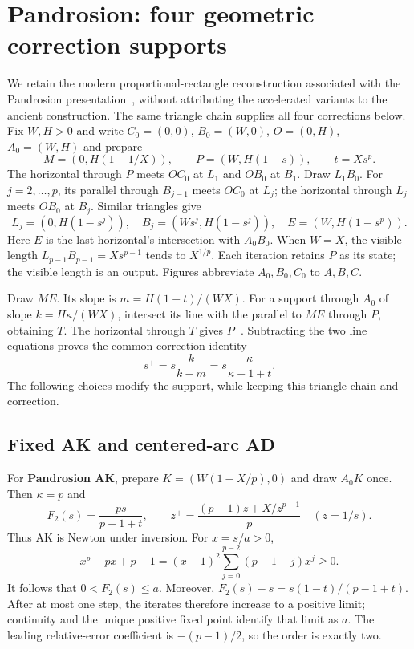 \documentclass[11pt,a4paper]{article}
\theoremstyle{remark}\newtheorem{remark}[theorem]{Remark}
\begin{document}
\section{Pandrosion: four geometric correction supports}\label{sec:pandrosion}
We retain the modern proportional-rectangle reconstruction associated with the Pandrosion presentation~\cite{launayPandrosion}, without attributing the accelerated variants to the ancient construction. The same triangle chain supplies all four corrections below. Fix $W,H>0$ and write $C_0=(0,0)$, $B_0=(W,0)$, $O=(0,H)$, $A_0=(W,H)$ and prepare
\[
 M=(0,H(1-1/X)),\qquad P=(W,H(1-s)),\qquad t=Xs^p.
\]
The horizontal through $P$ meets $OC_0$ at $L_1$ and $OB_0$ at $B_1$. Draw $L_1B_0$. For $j=2,\ldots,p$, its parallel through $B_{j-1}$ meets $OC_0$ at $L_j$; the horizontal through $L_j$ meets $OB_0$ at $B_j$. Similar triangles give
\begin{equation}\label{eq:pandchain}
 L_j=(0,H(1-s^j)),\quad B_j=(Ws^j,H(1-s^j)),\quad E=(W,H(1-s^p)).
\end{equation}
Here $E$ is the last horizontal's intersection with $A_0B_0$. When $W=X$, the visible length $L_{p-1}B_{p-1}=Xs^{p-1}$ tends to $X^{1/p}$. Each iteration retains $P$ as its state; the visible length is an output. Figures abbreviate $A_0,B_0,C_0$ to $A,B,C$.

Draw $ME$. Its slope is $m=H(1-t)/(WX)$. For a support through $A_0$ of slope $k=H\kappa/(WX)$, intersect its line with the parallel to $ME$ through $P$, obtaining $T$. The horizontal through $T$ gives $P^+$. Subtracting the two line equations proves the common correction identity
\begin{equation}\label{eq:commonreport}
 s^+=s\frac{k}{k-m}=s\frac{\kappa}{\kappa-1+t}.
\end{equation}
The following choices modify the support, while keeping this triangle chain and correction.

\subsection{Fixed AK and centered-arc AD}
For \textbf{Pandrosion AK}, prepare $K=(W(1-X/p),0)$ and draw $A_0K$ once. Then $\kappa=p$ and
\begin{equation}\label{eq:AK}
 F_2(s)=\frac{ps}{p-1+t},\qquad
 z^+=\frac{(p-1)z+X/z^{p-1}}p\quad(z=1/s).
\end{equation}
Thus AK is Newton under inversion. For $x=s/a>0$,
\[
 x^p-px+p-1=(x-1)^2\sum_{j=0}^{p-2}(p-1-j)x^j\ge0.
\]
It follows that $0<F_2(s)\le a$. Moreover, $F_2(s)-s=s(1-t)/(p-1+t)$. After at most one step, the iterates therefore increase to a positive limit; continuity and the unique positive fixed point identify that limit as $a$. The leading relative-error coefficient is $-(p-1)/2$, so the order is exactly two.
\end{document}
